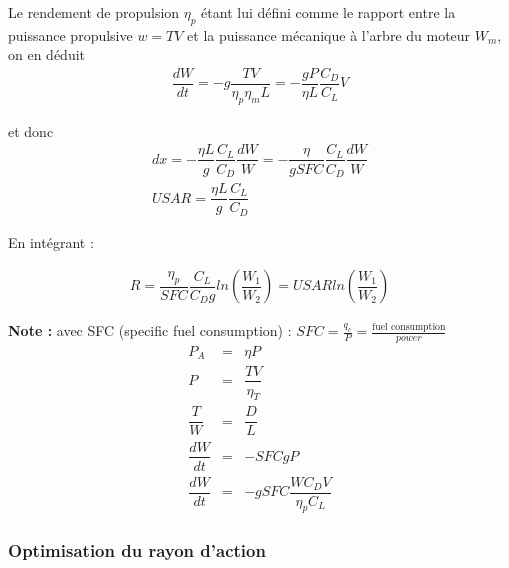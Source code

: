 \documentclass{report}
\begin{document}
Le rendement de propulsion $\eta_p$ étant lui défini comme le rapport entre la puissance propulsive $w=TV$ et la puissance mécanique à l'arbre du moteur $W_m$, on en déduit
\begin{eqnarray}
\dfrac{dW}{dt}=-g\dfrac{TV}{\eta_p\eta_m L}=-\dfrac{gP}{\eta L}\dfrac{C_D}{C_L}V
\end{eqnarray}

et donc
\begin{eqnarray}
dx=-\dfrac{\eta L}{g}\dfrac{C_L}{C_D}\dfrac{dW}{W} = -\dfrac{\eta}{gSFC}\dfrac{C_L}{C_D}\dfrac{dW}{W} \\
USAR = \dfrac{\eta L}{g}\dfrac{C_L}{C_D}
\end{eqnarray}

En intégrant :

\begin{eqnarray}
R= \dfrac{\eta_p}{SFC}\dfrac{C_L}{C_D g}ln(\dfrac{W_1}{W_2})=USAR ln(\dfrac{W_1}{W_2})
\end{eqnarray}

\textbf{Note :}
avec SFC (specific fuel consumption) : $SFC=\frac{q_c}{P}=\frac{\text{fuel consumption}}{power}$
\begin{eqnarray}
P_A &= &\eta P\\
P &= &\dfrac{TV}{\eta_T}\\
\dfrac{T}{W} &= &\dfrac{D}{L}\\
\dfrac{dW}{dt} &= &-SFC g P\\
\dfrac{dW}{dt} &= &-g SFC \dfrac{W C_D V}{\eta_p C_L}
\end{eqnarray}

\subsubsection{Optimisation du rayon d'action}
\end{document}
